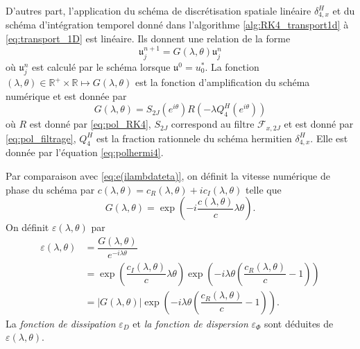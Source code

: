 D'autres part, l'application du schéma de discrétisation spatiale linéaire $\delta_{4,x}^H$ et du schéma d'intégration temporel donné dans l'algorithme \ref{alg:RK4_transport1d} à \eqref{eq:transport_1D} est linéaire. Ils donnent une relation de la forme
\begin{equation}
\mathfrak{u}_j^{n+1} = G(\lambda, \theta) \mathfrak{u}_j^n
\end{equation}
où $\mathfrak{u}_j^n$ est calculé par le schéma lorsque $\mathfrak{u}^0 = u_0^*$. La fonction $(\lambda, \theta) \in \mathbb{R}^+ \times \mathbb{R} \mapsto G(\lambda,\theta)$ est la fonction d'amplification du schéma numérique et est donnée par
\begin{equation}
G(\lambda, \theta) = S_{2J}(e^{i \theta}) R(- \lambda Q^H_{4}(e^{i \theta}) )
\end{equation}
où $R$ est donné par \eqref{eq:pol_RK4}, $S_{2J}$ correspond au filtre $\mathcal{F}_{x,2J}$ et est donné par \eqref{eq:pol_filtrage}, $Q_4^H$ est la fraction rationnele du schéma hermitien $\delta_{4,x}^H$. Elle est donnée par l'équation \eqref{eq:polhermi4}.

Par comparaison avec \eqref{eq:e(ilambdateta)}, on définit la  vitesse numérique de phase du schéma par $c(\lambda,\theta) = c_R(\lambda,\theta) + i c_I(\lambda,\theta)$ telle que
\begin{equation}
G(\lambda, \theta) = \exp \left( - i \dfrac{c(\lambda,\theta)}{c} \lambda \theta \right).
\end{equation}
On définit $\varepsilon(\lambda, \theta)$ par
\begin{align*}
\varepsilon(\lambda,\theta) & = \dfrac{G(\lambda,\theta)}{e^{- i \lambda \theta}} \\
	& = \exp \left( \dfrac{c_I(\lambda, \theta)}{c} \lambda \theta \right) \exp \left( - i \lambda \theta \left( \dfrac{c_R(\lambda, \theta)}{c} -1 \right) \right) \\
	& = |G(\lambda, \theta)| \exp \left( - i \lambda \theta \left( \dfrac{c_R(\lambda, \theta)}{c} -1 \right) \right).
\end{align*}
La \textit{fonction de dissipation} $\varepsilon_D$ et \textit{la fonction de dispersion} $\varepsilon_{\Phi}$ sont déduites de $\varepsilon(\lambda, \theta)$.

